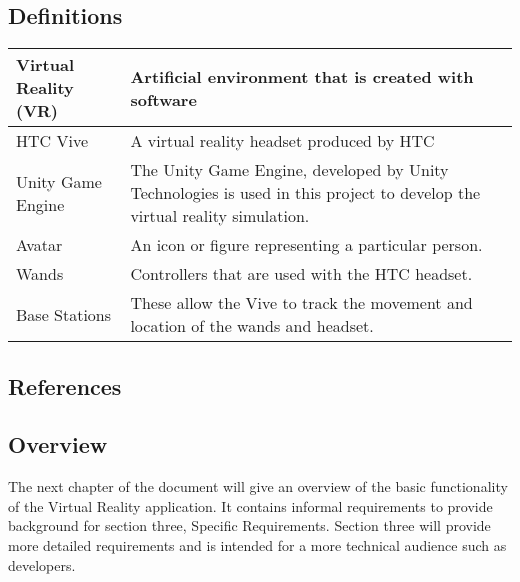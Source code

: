 \documentclass[10pt,journal,compsoc,onecolumn, draftclsnofoot]{IEEEtran}
\begin{document}
\subsection{Definitions}
\begin{center}
	\begin{tabular}{| m{3cm} | m{9cm} |}
		\hline
		Virtual Reality (VR) & Artificial environment that is created with software \\
		\hline
		HTC Vive & A virtual reality headset produced by HTC \\
		\hline
		Unity Game Engine & The Unity Game Engine, developed by Unity
		Technologies is used in this project to develop the virtual reality simulation. \\
    	\hline
    	Avatar & An icon or figure representing a particular person. \\
    	\hline
    	Wands & Controllers that are used with the HTC headset. \\
    	\hline
		Base Stations & These allow the Vive to track the movement and location of
    the wands and headset. \\
		\hline
	\end{tabular}
\end{center}

\subsection{References}
\begingroup
\renewcommand{\addcontentsline}[3]{}%
\renewcommand{\section}[2]{}%


\endgroup

\subsection{Overview}
The next chapter of the document will give an overview of the basic functionality
of the Virtual Reality application. It contains informal requirements to provide
background for section three, Specific Requirements. Section three
will provide more detailed requirements and is intended for a more
technical audience such as developers.
\end{document}
